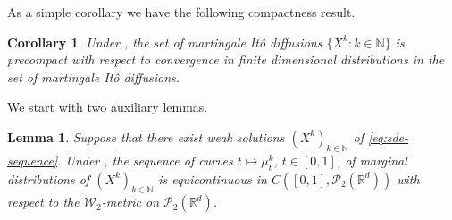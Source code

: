 \documentclass[12pt,oneside]{amsart}
\newtheorem{lemma}[theorem]{Lemma}
\newtheorem{corollary}[theorem]{Corollary}
\theoremstyle{definition}
\newcommand{\W}{\mathcal W}
\newcommand{\N}{\mathbb N}
\newcommand{\R}{\mathbb R}
\def\R{{\mathbb R}}
\numberwithin{equation}{section}
\begin{document}
As a simple corollary we have the following compactness result.

\begin{corollary}
    Under , the set of martingale It\^o diffusions $\{ X^k \colon k \in \N \}$ is precompact with respect to convergence in finite dimensional distributions in the set of martingale It\^o diffusions.
\end{corollary} 

We start with two auxiliary lemmas.

\begin{lemma}
    \label{lem:marginal_curves}
    Suppose that there exist weak solutions $(X^k)_{k \in \N}$ of \eqref{eq:sde-sequence}.
    Under , the sequence of curves $t \mapsto \mu^k_t$, $t \in [0,1]$, of marginal distributions of $(X^k)_{k \in \N}$ is equicontinuous in $C([0,1], \mathcal P_2(\R^d))$ with respect to the $\W_2$-metric on $\mathcal P_2(\R^d)$.
\end{lemma}
\end{document}

